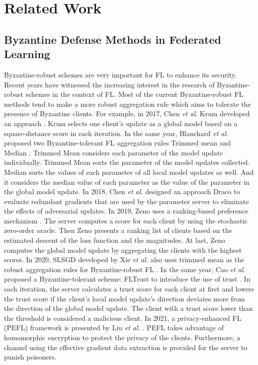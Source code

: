 \documentclass[journal]{IEEEtran}
\begin{document}
\section{Related Work}

\subsection{Byzantine Defense Methods in Federated Learning}
Byzantine-robust schemes are very important for FL to enhance its security. Recent years have witnessed the increasing interest in the research of Byzantine-robust schemes in the context of FL. Most of the current Byzantine-robust FL methods tend to make a more robust aggregation rule which aims to tolerate the presence of Byzantine clients. 
For example, in 2017, Chen \textit{et al}. Krum developed an approach \cite{ref_12_defense}. Krum selects one client's update as a global model based on a square-distance score in each iteration. 
In the same year, Blanchard \textit{et al}. proposed two Byzantine-tolerant FL aggregation rules Trimmed mean and Median \cite{ref_16_defense}. Trimmed Mean considers each parameter of the model update individually. Trimmed Mean sorts the parameter of the model updates collected. Median sorts the values of each parameter of all local model updates as well. And it considers the median value of each parameter as the value of the parameter in the global model update. 
In 2018, Chen \textit{et al.} designed an approach Draco to evaluate redundant gradients that are used by the parameter server to eliminate the effects of adversarial updates. 
In 2019, Zeno uses a ranking-based preference mechanism \cite{ref_15_defense}. The server computes a score for each client by using the stochastic zero-order oracle. Then Zeno presents a ranking list of clients based on the estimated descent of the loss function and the magnitudes. At last, Zeno computes the global model update by aggregating the clients with the highest scores. 
In 2020, SLSGD developed by Xie \textit{et al.} also uses trimmed mean as the robust aggregation rules for Byzantine-robust FL \cite{ref_14_defense}. 
In the same year, Cao \textit{et al.} proposed a Byzantine-tolerant scheme: FLTrust to introduce the use of trust \cite{ref_17_defense}. In each iteration, the server calculates a trust score for each client at first and lowers the trust score if the client's local model update's direction deviates more from the direction of the global model update. The client with a trust score lower than the threshold is considered a malicious client.
In 2021, a privacy-enhanced FL (PEFL) framework is presented by Liu \textit{et al.}  \cite{ref_45_defense}. PEFL takes advantage of homomorphic encryption to protect the privacy of the clients. Furthermore, a channel using the effective gradient data extraction is provided for the server to punish poisoners.
\end{document}
